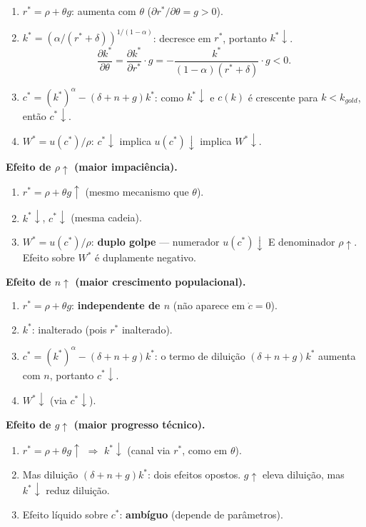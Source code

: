 \documentclass[12pt, a4paper]{article}
\begin{document}
\begin{enumerate}[leftmargin=*]
\item $r^* = \rho + \theta g$: aumenta com $\theta$ ($\partial r^*/\partial\theta = g > 0$).
\item $k^* = (\alpha/(r^*+\delta))^{1/(1-\alpha)}$: decresce em $r^*$, portanto $k^*\downarrow$.
\[
\frac{\partial k^*}{\partial\theta} = \frac{\partial k^*}{\partial r^*}\cdot g = -\frac{k^*}{(1-\alpha)(r^*+\delta)}\cdot g < 0.
\]
\item $c^* = (k^*)^\alpha - (\delta+n+g)k^*$: como $k^*\downarrow$ e $c(k)$ é crescente para $k<k_{gold}$, então $c^*\downarrow$.
\item $W^* = u(c^*)/\rho$: $c^*\downarrow$ implica $u(c^*)\downarrow$ implica $W^*\downarrow$.
\end{enumerate}

\textbf{Efeito de $\rho\uparrow$ (maior impaciência).}

\begin{enumerate}[leftmargin=*]
\item $r^* = \rho + \theta g\uparrow$ (mesmo mecanismo que $\theta$).
\item $k^*\downarrow$, $c^*\downarrow$ (mesma cadeia).
\item $W^* = u(c^*)/\rho$: \textbf{duplo golpe} --- numerador $u(c^*)\downarrow$ E denominador $\rho\uparrow$. Efeito sobre $W^*$ é duplamente negativo.
\end{enumerate}

\textbf{Efeito de $n\uparrow$ (maior crescimento populacional).}

\begin{enumerate}[leftmargin=*]
\item $r^* = \rho + \theta g$: \textbf{independente de $n$} (não aparece em $\dot{c}=0$).
\item $k^*\!$: inalterado (pois $r^*$ inalterado).
\item $c^* = (k^*)^\alpha - (\delta+n+g)k^*$: o termo de diluição $(\delta+n+g)k^*$ aumenta com $n$, portanto $c^*\downarrow$.
\item $W^*\downarrow$ (via $c^*\downarrow$).
\end{enumerate}

\textbf{Efeito de $g\uparrow$ (maior progresso técnico).}

\begin{enumerate}[leftmargin=*]
\item $r^* = \rho + \theta g\uparrow$ $\Rightarrow$ $k^*\downarrow$ (canal via $r^*$, como em $\theta$).
\item Mas diluição $(\delta+n+g)k^*$: dois efeitos opostos. $g\uparrow$ eleva diluição, mas $k^*\downarrow$ reduz diluição.
\item Efeito líquido sobre $c^*$: \textbf{ambíguo} (depende de parâmetros).
\end{enumerate}
\end{document}
